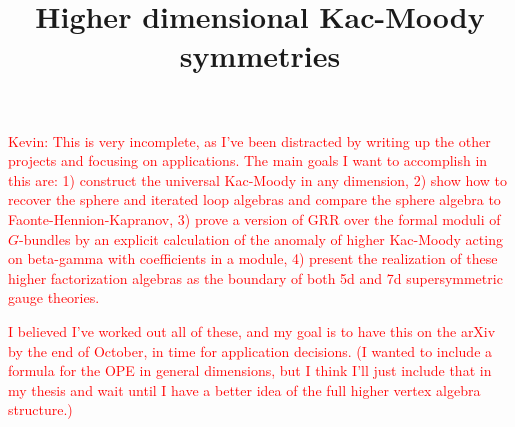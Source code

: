 \documentclass[10pt]{amsart}
\title{Higher dimensional Kac-Moody symmetries}
\begin{document}
\maketitle

%
\tableofcontents


\textcolor{red}{Kevin: This is very incomplete, as I've been distracted by writing up the other projects and focusing on applications. The main goals I want to accomplish in this are: 1) construct the universal Kac-Moody in any dimension, 2) show how to recover the sphere and iterated loop algebras and compare the sphere algebra to Faonte-Hennion-Kapranov, 3) prove a version of GRR over the formal moduli of $G$-bundles by an explicit calculation of the anomaly of higher Kac-Moody acting on beta-gamma with coefficients in a module, 4) present the realization of these higher factorization algebras as the boundary of both 5d and 7d supersymmetric gauge theories. }

\textcolor{red}{I believed I've worked out all of these, and my goal is to have this on the arXiv by the end of October, in time for application decisions.
(I wanted to include a formula for the OPE in general dimensions, but I think I'll just include that in my thesis and wait until I have a better idea of the full higher vertex algebra structure.)}







\end{document}
